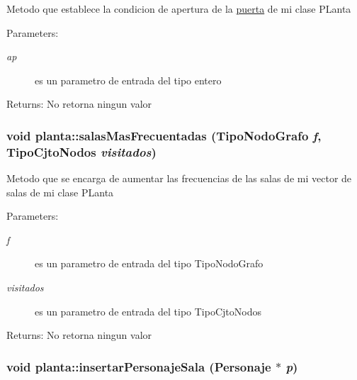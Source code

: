 Metodo que establece la condicion de apertura de la \hyperlink{classpuerta}{puerta} de mi clase PLanta \begin{Desc}
\item[Parameters:]
\begin{description}
\item[{\em ap}]es un parametro de entrada del tipo entero \end{description}
\end{Desc}
\begin{Desc}
\item[Returns:]No retorna ningun valor \end{Desc}
\hypertarget{classplanta_12c7cfe94fb585ff80db86046756e3d9}{
\subsubsection[salasMasFrecuentadas]{\setlength{\rightskip}{0pt plus 5cm}void planta::salasMasFrecuentadas (TipoNodoGrafo {\em f}, \/  TipoCjtoNodos {\em visitados})}}
\label{classplanta_12c7cfe94fb585ff80db86046756e3d9}


Metodo que se encarga de aumentar las frecuencias de las salas de mi vector de salas de mi clase PLanta \begin{Desc}
\item[Parameters:]
\begin{description}
\item[{\em f}]es un parametro de entrada del tipo TipoNodoGrafo \item[{\em visitados}]es un parametro de entrada del tipo TipoCjtoNodos \end{description}
\end{Desc}
\begin{Desc}
\item[Returns:]No retorna ningun valor \end{Desc}
\hypertarget{classplanta_b2856a872a24f50fb52dd6b35e878c55}{
\subsubsection[insertarPersonajeSala]{\setlength{\rightskip}{0pt plus 5cm}void planta::insertarPersonajeSala ({\bf Personaje} $\ast$ {\em p})}}
\label{classplanta_b2856a872a24f50fb52dd6b35e878c55}



